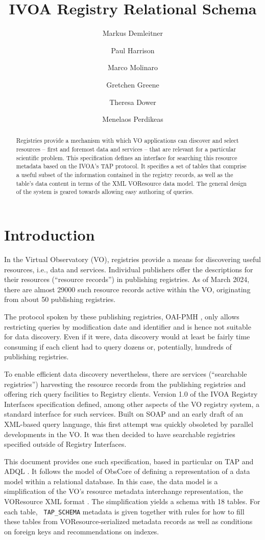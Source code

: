 \documentclass[11pt,a4paper]{ivoa}
\author[http://www.ivoa.net/cgi-bin/twiki/bin/view/IVOA/MarkusDemleitner]{Markus Demleitner}
\author[http://www.ivoa.net/cgi-bin/twiki/bin/view/IVOA/PaulHarrison]{Paul Harrison}
\author[http://www.ivoa.net/cgi-bin/twiki/bin/view/IVOA/MarcoMolinaro]{Marco Molinaro}
\author[http://www.ivoa.net/cgi-bin/twiki/bin/view/IVOA/GretchenGreene]{Gretchen Greene}
\author[http://www.ivoa.net/cgi-bin/twiki/bin/view/IVOA/TheresaDower]{Theresa Dower}
\author[http://wiki.ivoa.net/twiki/bin/view/IVOA/MenelaosPerdikeas]{Menelaos Perdikeas}
\title{IVOA Registry Relational Schema}
\newcommand{\tapent}[1]{\texttt{\color{tapcolor} #1}}
\begin{document}
\begin{abstract}
Registries provide a mechanism with which VO applications can
discover and select resources -- first and foremost data and
services -- that are relevant for a particular scientific problem.
This specification defines  an interface for searching this resource
metadata based on the IVOA's TAP protocol.  It specifies a set of tables
that comprise a useful subset of the information contained in the
registry records, as well as the table's data content in terms of the
XML VOResource data model.  The general design of the system is geared
towards allowing easy authoring of queries.
\end{abstract}


\section{Introduction}

\label{intro}

In the Virtual Observatory (VO), registries provide a means for
discovering useful resources, i.e., data and services.  Individual
publishers offer the descriptions for their resources (``resource
records'') in publishing registries.  As of March 2024, there are
almost 29000 such resource records active within the VO, originating
from about 50 publishing registries.

The protocol spoken by these
publishing registries, OAI-PMH \citep{std:OAIPMH}, only allows restricting queries by
modification date and identifier and is hence not suitable for data discovery.
Even if it were, data discovery would at least be fairly time consuming if
each client had to query dozens or, potentially, hundreds of
publishing registries.

To enable efficient data discovery nevertheless, there are services
(``searchable registries'') harvesting the
resource records from the publishing registries and offering rich query
facilities to Registry clients.
Version 1.0 of the IVOA Registry
Interfaces specification \citep{2009ivoa.spec.1104B} defined, among other aspects of
the VO registry system, a standard interface for such services.
Built on SOAP and an early draft of an XML-based query language,
this first attempt was quickly obsoleted by parallel
developments in the VO.  It was then decided to have searchable
registries specified outside of Registry Interfaces.

This document provides one such specification, based in particular on TAP \citep{2010ivoa.spec.0327D}
and ADQL \citep{2023ivoa.spec.1215M}.  It follows the model of ObsCore
\citep{2017ivoa.spec.0509L} of defining a representation of a data model
within a relational database.  In this case, the data model is a
simplification of the VO's resource metadata interchange representation,
the VOResource XML format \citep{2018ivoa.spec.0625P}.  The simplification
yields a schema with 18 tables.  For each table, \tapent{TAP\_SCHEMA} metadata is given together
with rules for how to fill these tables from VOResource-serialized
metadata records as well as conditions on foreign keys and
recommendations on indexes.
\end{document}
